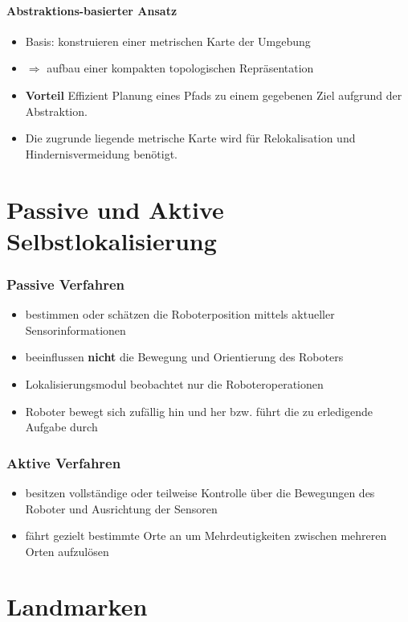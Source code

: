 \paragraph{Abstraktions-basierter Ansatz}
\begin{itemize}
	\item Basis: konstruieren einer metrischen Karte der Umgebung
	\item $\Rightarrow$ aufbau einer kompakten topologischen Repräsentation
	\item \textbf{Vorteil} Effizient Planung eines Pfads zu einem gegebenen Ziel
		aufgrund der Abstraktion.
	\item Die zugrunde liegende metrische Karte wird für Relokalisation und
		Hindernisvermeidung benötigt.
\end{itemize}

\section{Passive und Aktive Selbstlokalisierung}
\subsubsection*{Passive Verfahren}
\begin{itemize}
	\item bestimmen oder schätzen die Roboterposition mittels aktueller
		Sensorinformationen
	\item beeinflussen \textbf{nicht} die Bewegung und Orientierung des Roboters
	\item Lokalisierungsmodul beobachtet nur die Roboteroperationen
	\item Roboter bewegt sich zufällig hin und her bzw. führt die zu erledigende
		Aufgabe durch
\end{itemize}

\subsubsection*{Aktive Verfahren}
\begin{itemize}
	\item besitzen vollständige oder teilweise Kontrolle über die Bewegungen des
		Roboter und Ausrichtung der Sensoren
	\item fährt gezielt bestimmte Orte an um Mehrdeutigkeiten zwischen mehreren
		Orten aufzulösen
\end{itemize}

\section{Landmarken}
